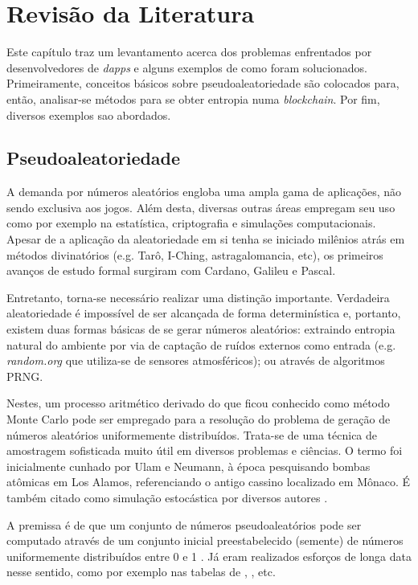 \documentclass[a4paper,12pt]{monografia}
\theoremstyle{plain}
\theoremstyle{definition}
\theoremstyle{remark}
\begin{document}
\chapter{Revis\~{a}o da Literatura}

Este cap\'{i}tulo traz um levantamento acerca dos problemas enfrentados por desenvolvedores de \textit{dapps} e alguns exemplos de como foram solucionados.
Primeiramente, conceitos b\'asicos sobre pseudoaleatoriedade s\~ao colocados para, ent\~ao, analisar-se m\'etodos para se obter entropia numa \textit{blockchain}. Por fim, diversos exemplos sao abordados.

\section{Pseudoaleatoriedade}

A demanda por n\'{u}meros aleat\'orios engloba uma ampla gama de aplica\c{c}\~{o}es, n\~{a}o sendo exclusiva aos jogos.
Al\'{e}m desta, diversas outras \'{a}reas empregam seu uso como por exemplo na estat\'{i}stica, criptografia e simula\c{c}\~{o}es computacionais.
Apesar de a aplica\c{c}\~ao da aleatoriedade em si tenha se iniciado mil\^enios atr\'as em m\'etodos divinat\'orios (e.g. Tar\^o, I-Ching, astragalomancia, etc), os primeiros avan\c{c}os de estudo formal surgiram com Cardano, Galileu e Pascal.

Entretanto, torna-se necess\'{a}rio realizar uma distin\c{c}\~{a}o importante.
Verdadeira aleatoriedade \'{e} imposs\'{i}vel de ser alcan\c{c}ada de forma determin\'{i}stica \cite{neumann} e, portanto, existem duas formas b\'{a}sicas de se gerar n\'{u}meros aleat\'{o}rios: extraindo entropia natural do ambiente por via de capta\c{c}\~ao de ru\'idos externos como entrada (e.g. \textit{random.org} que utiliza-se de sensores atmosf\'ericos); ou atrav\'{e}s de algoritmos PRNG.

Nestes, um processo aritm\'{e}tico derivado do que ficou conhecido como m\'{e}todo Monte Carlo pode ser empregado para a resolu\c{c}\~{a}o do problema de gera\c{c}\~{a}o de n\'{u}meros aleat\'{o}rios uniformemente distribu\'{i}dos.
Trata-se de uma t\'{e}cnica de amostragem sofisticada muito \'{u}til em diversos problemas e ci\^{e}ncias.
O termo foi inicialmente cunhado por Ulam e Neumann, \`{a} \'{e}poca pesquisando bombas at\^{o}micas em Los Alamos, referenciando o antigo cassino localizado em M\^{o}naco.
\'{E} tamb\'{e}m citado como simula\c{c}\~{a}o estoc\'{a}stica por diversos autores \cite{montecarlo}.

A premissa \'{e} de que um conjunto de n\'{u}meros pseudoaleat\'{o}rios pode ser computado atrav\'{e}s de um conjunto inicial preestabelecido (semente) de n\'{u}meros uniformemente distribu\'{i}dos entre 0 e 1 \cite{johnson}.
J\'{a} eram realizados esfor\c{c}os de longa data nesse sentido, como por exemplo nas tabelas de , , etc.
\end{document}
